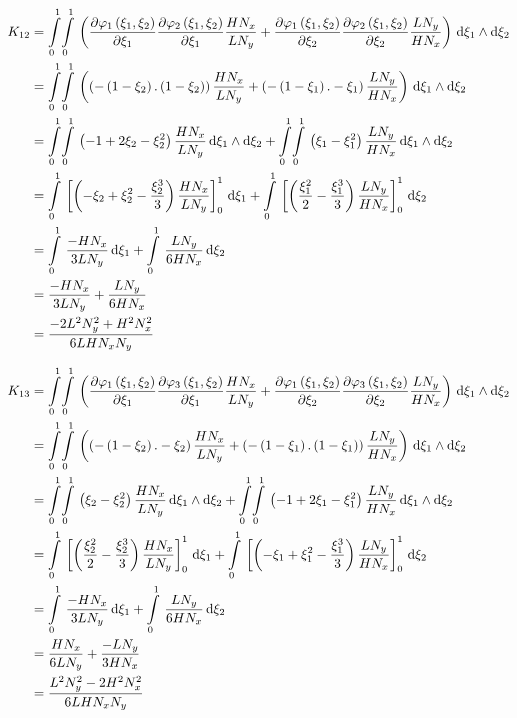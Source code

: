 \begin{equation}
  \begin{aligned}
    K_{12}&=\giint{0}{1}{0}{1}{\pbrac{\delby{\lbfn{1}{\xi_{1},\xi_{2}}}{\xi_{1}}\delby{\lbfn{2}{\xi_{1},\xi_{2}}}{\xi_{1}}
        \dfrac{H N_{x}}{L N_{y}}+\delby{\lbfn{1}{\xi_{1},\xi_{2}}}{\xi_{2}}\delby{\lbfn{2}{\xi_{1},\xi_{2}}}{\xi_{2}}
        \dfrac{L N_{y}}{H N_{x}}}}{\xi_{1}}{\xi_{2}}\\
    &=\giint{0}{1}{0}{1}{\pbrac{\pbrac{-\pbrac{1-\xi_{2}}.\pbrac{1-\xi_{2}}}\dfrac{H N_{x}}{L N_{y}}+
    \pbrac{-\pbrac{1-\xi_{1}}.-\xi_{1}}\dfrac{L N_{y}}{H N_{x}}}}{\xi_{1}}{\xi_{2}} \\
    &=\giint{0}{1}{0}{1}{\pbrac{-1+2\xi_{2}-\xi_{2}^{2}}\dfrac{H N_{x}}{L N_{y}}}{\xi_{1}}{\xi_{2}}+
    \giint{0}{1}{0}{1}{\pbrac{\xi_{1}-\xi_{1}^{2}}\dfrac{L N_{y}}{H N_{x}}}{\xi_{1}}{\xi_{2}} \\
    &=\gint{0}{1}{\sqbrac{\pbrac{-\xi_{2}+\xi_{2}^{2}-\dfrac{\xi_{2}^{3}}{3}}\dfrac{H N_{x}}{L N_{y}}}_{0}^{1}}{\xi_{1}}+
    \gint{0}{1}{\sqbrac{\pbrac{\dfrac{\xi_{1}^{2}}{2}-\dfrac{\xi_{1}^{3}}{3}}\dfrac{L N_{y}}{H N_{x}}}_{0}^{1}}{\xi_{2}} \\
    &=\gint{0}{1}{\dfrac{-H N_{x}}{3 L N_{y}}}{\xi_{1}}+\gint{0}{1}{\dfrac{L N_{y}}{6 H N_{x}}}{\xi_{2}} \\
    &=\dfrac{-H N_{x}}{3 L N_{y}}+\dfrac{L N_{y}}{6 H N_{x}} \\
    &=\dfrac{-2 L^{2}N_{y}^{2}+H^{2}N_{x}^{2}}{6 L H N_{x} N_{y}}
  \end{aligned}
\end{equation}

\begin{equation}
  \begin{aligned}
    K_{13}&=\giint{0}{1}{0}{1}{\pbrac{\delby{\lbfn{1}{\xi_{1},\xi_{2}}}{\xi_{1}}\delby{\lbfn{3}{\xi_{1},\xi_{2}}}{\xi_{1}}
        \dfrac{H N_{x}}{L N_{y}}+\delby{\lbfn{1}{\xi_{1},\xi_{2}}}{\xi_{2}}\delby{\lbfn{3}{\xi_{1},\xi_{2}}}{\xi_{2}}
        \dfrac{L N_{y}}{H N_{x}}}}{\xi_{1}}{\xi_{2}}\\
    &=\giint{0}{1}{0}{1}{\pbrac{\pbrac{-\pbrac{1-\xi_{2}}.-\xi_{2}}\dfrac{H N_{x}}{L N_{y}}+
    \pbrac{-\pbrac{1-\xi_{1}}.\pbrac{1-\xi_{1}}}\dfrac{L N_{y}}{H N_{x}}}}{\xi_{1}}{\xi_{2}} \\
    &=\giint{0}{1}{0}{1}{\pbrac{\xi_{2}-\xi_{2}^{2}}\dfrac{H N_{x}}{L N_{y}}}{\xi_{1}}{\xi_{2}}+
    \giint{0}{1}{0}{1}{\pbrac{-1+2\xi_{1}-\xi_{1}^{2}}\dfrac{L N_{y}}{H N_{x}}}{\xi_{1}}{\xi_{2}} \\
    &=\gint{0}{1}{\sqbrac{\pbrac{\dfrac{\xi_{2}^{2}}{2}-\dfrac{\xi_{2}^{3}}{3}}\dfrac{H N_{x}}{L N_{y}}}_{0}^{1}}{\xi_{1}}+
    \gint{0}{1}{\sqbrac{\pbrac{-\xi_{1}+\xi_{1}^{2}-\dfrac{\xi_{1}^{3}}{3}}\dfrac{L N_{y}}{H N_{x}}}_{0}^{1}}{\xi_{2}} \\
    &=\gint{0}{1}{\dfrac{-H N_{x}}{3 L N_{y}}}{\xi_{1}}+\gint{0}{1}{\dfrac{L N_{y}}{6 H N_{x}}}{\xi_{2}} \\
    &=\dfrac{H N_{x}}{6 L N_{y}}+\dfrac{-L N_{y}}{3 H N_{x}} \\
    &=\dfrac{L^{2}N_{y}^{2}-2 H^{2}N_{x}^{2}}{6 L H N_{x} N_{y}}
  \end{aligned}
\end{equation}

